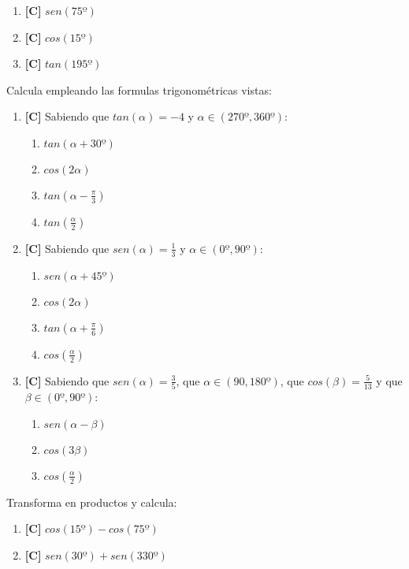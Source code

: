 \begin{enumerate}[topsep=0pt]
	\item \textbf{[C]} $sen(75º)$
	\item \textbf{[C]} $cos(15º)$
	\item \textbf{[C]} $tan(195º)$
\end{enumerate}


\Exercicio Calcula empleando las formulas trigonométricas vistas:

\begin{enumerate}[topsep=0pt]
	\item \textbf{[C]} Sabiendo que $tan(\alpha) = -4$ y $\alpha \in (270º,360º)$:
		\begin{enumerate}[topsep=0pt, label=\arabic*)]
		\item  $tan(\alpha + 30º)$
		\item $cos(2\alpha)$
		\item $tan(\alpha - \frac{\pi}{3})$
		\item $tan(\frac{\alpha}{2})$
		\end{enumerate}

	\item \textbf{[C]} Sabiendo que $sen(\alpha) = \frac{1}{3}$ y $\alpha \in (0º,90º)$:
		\begin{enumerate}[topsep=0pt, label=\arabic*)]
		\item $sen(\alpha + 45º)$
		\item $cos(2\alpha)$
		\item $tan(\alpha + \frac{\pi}{6})$
		\item $cos(\frac{\alpha}{2})$
		\end{enumerate}
	\item \textbf{[C]} Sabiendo que $sen(\alpha) = \frac{3}{5}$, que $\alpha \in (90,180º)$, que $cos(\beta) = \frac{5}{13}$ y que $ \beta \in (0º,90º)$:
		\begin{enumerate}[topsep=0pt, label=\arabic*)]
		\item $sen(\alpha - \beta)$
		\item $cos(3\beta)$
		\item $cos(\frac{\alpha}{2})$
		\end{enumerate}
\end{enumerate}


\Exercicio Transforma en productos y calcula:

\begin{enumerate}[topsep=0pt]
	\item \textbf{[C]} $cos(15º) - cos(75º)$
	\item \textbf{[C]} $sen(30º) + sen(330º)$
\end{enumerate}


